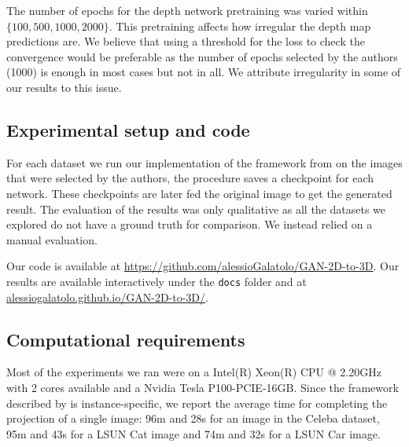 The number of epochs for the depth network pretraining was varied within $\{100, 500, 1000, 2000\}$. This pretraining affects how irregular the depth map predictions are. We believe that using a threshold for the loss to check the convergence would be preferable as the number of epochs selected by the authors (1000) is enough in most cases but not in all. We attribute irregularity in some of our results to this issue. 

\subsection{Experimental setup and code}
For each dataset we run our implementation of the framework from \cite{gan2shape} on the images that were selected by the authors, the procedure saves a checkpoint for each network. These checkpoints are later fed the original image to get the generated result. The evaluation of the results was only qualitative as all the datasets we explored do not have a ground truth for comparison. We instead relied on a manual evaluation.

Our code is available at \url{https://github.com/alessioGalatolo/GAN-2D-to-3D}. Our results are available interactively under the \lstinline{docs} folder and at \href{https://alessiogalatolo.github.io/GAN-2D-to-3D/}{alessiogalatolo.github.io/GAN-2D-to-3D/}.
\subsection{Computational requirements}
Most of the experiments we ran were on a Intel(R) Xeon(R) CPU @ 2.20GHz with 2 cores available and a Nvidia Tesla P100-PCIE-16GB. Since the framework described by \cite{gan2shape} is instance-specific, we report the average time for completing the projection of a single image: 96m and 28s for an image in the Celeba dataset, 95m and 43s for a LSUN Cat image and 74m and 32s for a LSUN Car image.
